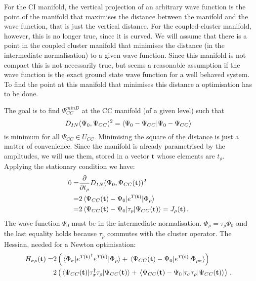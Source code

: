 For the CI manifold, the vertical projection of an arbitrary wave function
is the point of the manifold that maximises the distance between the manifold
and the wave function, that is just the vertical distance.
For the coupled-cluster manifold, however, this is no longer true, since it is curved.
We will assume that there is a point in the coupled cluster manifold that minimises the
distance (in the intermediate normalisation) to a given wave function.
Since this manifold is not compact this is not necessarily true,
but seems a reasonable assumption if the wave function is the exact ground state
wave function for a well behaved system.
To find the point at this manifold that minimises this distance a optimisation has to be done.

The goal is to find $\Psi_{CC}^{minD}$ at the CC manifold (of a given level)
such that
\begin{equation}\label{eq:dist_CC_FCI}
  D_{IN}(\Psi_0, \Psi_{CC})^2 = \braket{\Psi_0 - \Psi_{CC}}{\Psi_0 - \Psi_{CC}}
\end{equation}
is minimum for all $\Psi_{CC} \in U_{CC}$.
Minimising the square of the distance is just a matter of convenience.
Since the manifold is already parametrised by the amplitudes,
we will use them, stored in a vector $\mathbf{t}$ whose elements are $t_\rho$.
Applying the stationary condition we have:
\begin{equation}\label{eq:cc_minD_jac}
  \begin{split}
    0 =& \frac{\partial}{\partial t_\rho} D_{IN}(\Psi_0, \Psi_{CC}(\mathbf{t}))^2\\
    =& 2 \mel{\Psi_{CC}(\mathbf{t}) - \Psi_0}{e^{T(\mathbf{t})}}{\Phi_\rho}\\
    =& 2 \mel{\Psi_{CC}(\mathbf{t}) - \Psi_0}{\tau_\rho}{\Psi_{CC}(\mathbf{t})} = J_\rho(\mathbf{t})\,.
  \end{split}
\end{equation}
The wave function $\Psi_0$ must be in the intermediate normalisation.
$\Phi_\rho = \tau_\rho\Phi_0$ and the last equality holds because $\tau_\rho$ commutes with
the cluster operator.
The Hessian, needed for a Newton optimisation:
\begin{equation}\label{eq:cc_minD_hess}
  \begin{split}
    H_{\sigma\rho}(\mathbf{t}) =
    & 2\left( \mel{\Phi_\sigma}{e^{T(\mathbf{t})^\dagger}e^{T(\mathbf{t})}}{\Phi_\rho}
      + \mel{\Psi_{CC}(\mathbf{t}) - \Psi_0}{e^{T(\mathbf{t})}}{\Phi_{\rho\sigma}} \right)\\
    & 2\left( \mel{\Psi_{CC}(\mathbf{t})}{\tau_\sigma^\dagger\tau_\rho}{\Psi_{CC}(\mathbf{t})}
    + \mel{\Psi_{CC}(\mathbf{t}) - \Psi_0}{\tau_\sigma\tau_\rho}{\Psi_{CC}(\mathbf{t})} \right)\,.
  \end{split}
\end{equation}

